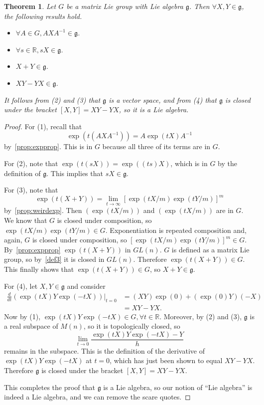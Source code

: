 \documentclass[12pt]{article}
\newcommand{\R}{\mathbb{R}}
\newcommand{\g}{\mathfrak{g}}
\newtheorem{them}{Theorem}[section]
\theoremstyle{definition}
\theoremstyle{definition}
\theoremstyle{definition}
\theoremstyle{definition}
\theoremstyle{definition}
\theoremstyle{definition}
\theoremstyle{definition}
\theoremstyle{definition}
\begin{document}
\begin{them}
    Let $G$ be a matrix Lie group with Lie algebra
    $\g$. Then $\forall X, Y \in \g$, the
    following results hold.
\begin{itemize}
    \item $\forall A \in G, AXA^{-1} \in \g$.
    \item $\forall s \in \R, sX \in \g$.
    \item $X + Y \in \g$.
    \item $XY - YX \in \g$.
\end{itemize}
It follows from (2) and (3) that $\g$ is a vector
space, and from (4) that $\g$ is closed under the
bracket $[X,Y] = XY - YX$, so it is a Lie algebra.
\end{them}

\begin{proof}
\par{For (1), recall that 
\[\exp(t(AXA^{-1})) = A \exp(tX) A^{-1}\]
by~\ref{prop:expprop}. This is in $G$ because all
three of its terms are in $G$.}

\par{For (2), note that $\exp(t(sX)) =
\exp((ts)X)$, which is in $G$ by the
definition of $\g$. This implies that $sX \in
\g$.}

\par{For (3), note that
\[\exp(t(X+Y)) = \lim_{t \to
\infty}{[\exp(tX/m)\exp(tY/m)]}^m\]
by~\ref{prop:weirdexp}. Then $(\exp(tX/m))$ and
$(\exp(tX/m))$ are in $G$. We know that $G$ is
closed under composition, so $\exp(tX/m)\exp(tY/m)
\in G$. Exponentiation is repeated composition
and, again, $G$ is closed under composition, so
${[\exp(tX/m)\exp(tY/m)]}^m \in G$.
By~\ref{prop:expprop} $\exp(t(X+Y))$ in $GL(n)$.
$G$ is defined as a matrix Lie group, so
by~\ref{def3} it is closed in $GL(n)$. Therefore
$\exp(t(X+Y)) \in G$. This finally shows that
$\exp(t(X+Y)) \in G$, so $X + Y \in \g$. }

\par{For (4), let $X, Y \in \g$ and consider
\[\begin{aligned}
    \frac{d}{dt}(\exp(tX)Y\exp(-tX))\Big|_{t=0} &
    = (XY)\exp(0) + (\exp(0)Y)(-X)\\ 
& = XY - YX.\end{aligned}\] Now by (1), $\exp(tX) Y \exp(-tX)
\in G, \forall t \in \R$. Moreover, by (2) and
(3), $\g$ is a real subspace of $M(n)$, so it is
topologically closed, so
\[\lim_{t \to 0}\frac{\exp(tX)Y\exp(-tX) - Y}{h}\]
remains in the subspace. This is the definition of
the derivative of $\exp(tX)Y\exp(-tX)$ at $t = 0$, which has just been
shown to equal $XY-YX$. Therefore $\g$ is closed
under the bracket $[X,Y] = XY - YX$.
}

\par{This completes the proof that $\g$ is a Lie algebra, so our notion of “Lie algebra” is indeed a Lie algebra, and we can remove the scare quotes.}
\end{proof}
\end{document}
